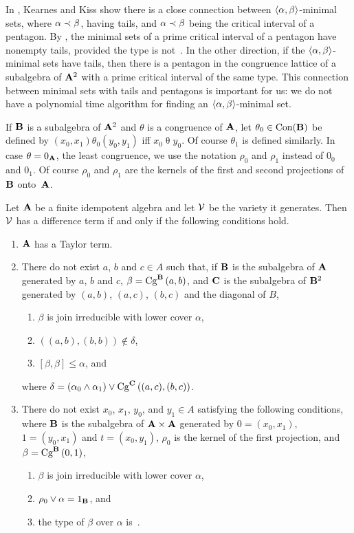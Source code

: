 In \cite{KearnesKiss1999}, Kearnes and Kiss show there is a close connection
between $\la \alpha,\beta\ra$-minimal sets, where $\alpha \cov \beta$, 
having tails, and  $\alpha \cov \beta$ being the critical interval of
a pentagon. By \cite[Theorem 2.1]{KearnesKiss1999}, the minimal sets
of a prime critical interval of a pentagon have nonempty tails, provided
the type is not~\utyp. In the other direction, if the 
$\la \alpha,\beta\ra$-minimal sets have tails, then there is a pentagon in
the congruence lattice of a subalgebra of $\alg A^2$ with a prime critical 
interval of the same type. This connection between minimal sets with tails and
pentagons is important for us: we do not have a polynomial time algorithm
for finding an $\la \alpha,\beta\ra$-minimal set.

If $\alg B$ is a subalgebra of $\alg A^2$ and $\theta$ is a congruence
of $\alg A$, let $\theta_0 \in \con (\alg B)$ be defined by
$(x_0,x_1) \mathrel{\theta_0} (y_0,y_1)$ iff 
$x_0 \mathrel{\theta} y_0$. Of course $\theta_1$ is defined similarly.
In case $\theta = 0_{\alg A}$, the least congruence,
we use the notation $\rho_0$ and $\rho_1$ instead of 
$0_0$ and $0_1$. Of course $\rho_0$ and $\rho_1$ are the kernels
of the first and second projections of $\alg B$ onto~$\alg A$.



\begin{theorem}\label{thm:algorithm}
Let $\alg A$ be a finite idempotent algebra and let $\sV$ be the variety 
it generates. Then $\sV$ has a difference term if and only if the
following conditions hold.
\begin{enumerate}
\item $\alg A$ has a Taylor term.
\item There do not exist $a$, $b$ and $c\in A$
such that, if\/ $\alg B$ is the subalgebra of $\alg A$ generated
by $a$, $b$ and $c$,  $\beta = \Cga a b B$, and
$\alg C$ is the subalgebra of $\alg B^2$ generated by 
$(a,b)$, $(a,c)$, $(b,c)$ and the diagonal of $B$,
\begin{enumerate}
\item $\beta$ is join irreducible with lower cover $\alpha$,
\item $((a,b),(b,b)) \notin \delta$, 
\item $[\beta,\beta] \le \alpha$, and
\end{enumerate}
where $\delta = (\alpha_0 \meet \alpha_1) \join \Cga {(a,c)} {(b,c)} C$.
\item There do not exist $x_0$, $x_1$, $y_0$, and $y_1\in A$ satisfying
the following conditions, where 
$\alg B$ is the subalgebra of 
$\alg A \times \alg A$ generated by $0 = (x_0, x_1)$, $1 = (y_0,x_1)$ 
and $t = (x_0,y_1)$, $\rho_0$ is the kernel of the first projection,
and $\beta = \Cga01{B}$,
\begin{enumerate}
\item $\beta$ is join irreducible with lower cover $\alpha$,
\item 
$\rho_0 \join \alpha = 1_{\alg B}$, and
\item the type of $\beta$ over  $\alpha$ is~\atyp.
\end{enumerate}
\end{enumerate}
\end{theorem}

